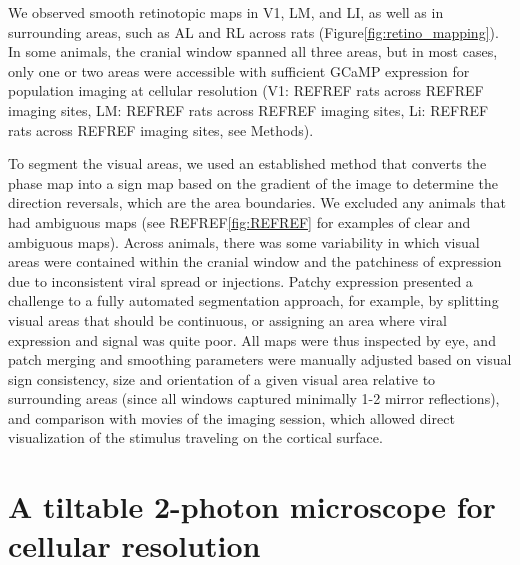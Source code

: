 We observed smooth retinotopic maps in  V1, LM, and LI, as well as in surrounding areas, such as AL and RL across rats (Figure\ref{fig:retino_mapping}). In some animals, the cranial window spanned all three areas, but in most cases, only one or two areas were accessible with sufficient GCaMP expression for population imaging at cellular resolution (V1: REFREF rats across REFREF imaging sites, LM: REFREF rats across REFREF imaging sites, Li: REFREF rats across REFREF imaging sites, see Methods).

To segment the visual areas, we used an established method that converts the phase map into a sign map based on the gradient of the image to determine the direction reversals, which are the area boundaries\cite{Garrett2014, Zhuang2017}. We excluded any animals that had ambiguous maps (see REFREF\ref{fig:REFREF} for examples of clear and ambiguous maps). Across animals, there was some variability in which visual areas were contained within the cranial window and the patchiness of expression due to inconsistent viral spread or injections. Patchy expression presented a challenge to a fully automated segmentation approach, for example, by splitting visual areas that should be continuous, or assigning an area where viral expression and signal was quite poor. All maps were thus inspected by eye, and patch merging and smoothing parameters were manually adjusted based on visual sign consistency, size and orientation of a given visual area relative to surrounding areas (since all windows captured minimally 1-2 mirror reflections), and comparison with movies of the imaging session, which allowed direct visualization of the stimulus traveling on the cortical surface. 

\section{A tiltable 2-photon microscope for cellular resolution}

